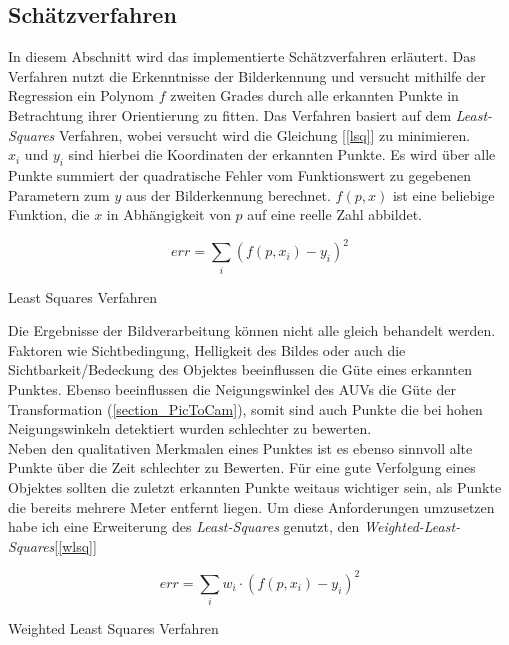\subsection{Schätzverfahren}
\label{sec_curveFit}
In diesem Abschnitt wird das implementierte Schätzverfahren erläutert. Das Verfahren nutzt die Erkenntnisse der Bilderkennung und versucht mithilfe der Regression ein Polynom $f$ zweiten  Grades durch alle erkannten Punkte in Betrachtung ihrer Orientierung zu fitten.
Das Verfahren basiert auf dem \textit{Least-Squares} Verfahren\cite{simon2006optimal}, wobei versucht wird die Gleichung [\ref{lsq}] zu minimieren.\\
$x_i$ und $y_i$ sind hierbei die Koordinaten der erkannten Punkte. Es wird über alle Punkte summiert der quadratische Fehler vom Funktionswert zu gegebenen Parametern zum $y$ aus der Bilderkennung berechnet. $f(p,x)$ ist eine beliebige Funktion, die $x$ in Abhängigkeit von $p$ auf eine reelle Zahl abbildet.\\
\begin{ownequation}[H]
\begin{equation}
err = \sum_{i}(f(p,x_i)-y_i)^2
\end{equation}
\caption{Least Squares Verfahren}
\label{lsq}
\end{ownequation}
Die Ergebnisse der Bildverarbeitung können nicht alle gleich behandelt werden. Faktoren wie Sichtbedingung, Helligkeit des Bildes oder auch die Sichtbarkeit/Bedeckung des Objektes beeinflussen die Güte eines erkannten Punktes. Ebenso beeinflussen die Neigungswinkel des AUVs die Güte der Transformation (\ref{section_PicToCam}), somit sind auch Punkte die bei hohen Neigungswinkeln detektiert wurden schlechter zu bewerten.\\
Neben den qualitativen Merkmalen eines Punktes ist es ebenso sinnvoll alte Punkte über die Zeit schlechter zu Bewerten. Für eine gute Verfolgung eines Objektes sollten die zuletzt erkannten Punkte weitaus wichtiger sein, als Punkte die bereits mehrere Meter entfernt liegen.
Um diese Anforderungen umzusetzen habe ich eine Erweiterung des \textit{Least-Squares} genutzt, den \textit{Weighted-Least-Squares}[\ref{wlsq}]\\
\begin{ownequation}[H]
\begin{equation}
err = \sum_{i}w_i \cdot (f(p,x_i)-y_i)^2
\end{equation}
\caption{Weighted Least Squares Verfahren}
\label{wlsq}
\end{ownequation}

